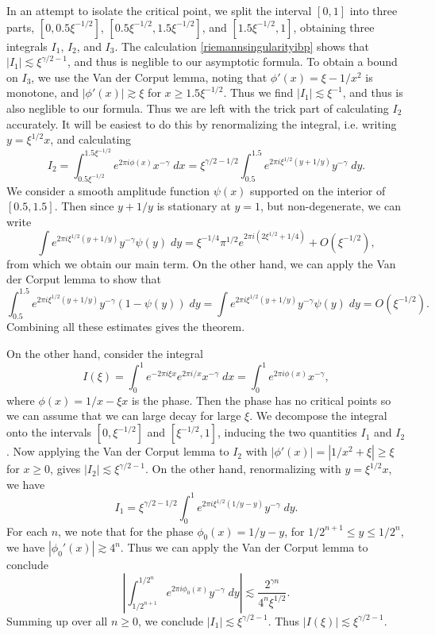 \begin{example}
  In an attempt to isolate the critical point, we split the interval $[0,1]$ into three parts, $[0,0.5 \xi^{-1/2}]$, $[0.5 \xi^{-1/2},1.5 \xi^{-1/2}]$, and $[1.5 \xi^{-1/2},1]$, obtaining three integrals $I_1$, $I_2$, and $I_3$. The calculation \eqref{riemannsingularityibp} shows that $|I_1| \lesssim \xi^{\gamma/2 - 1}$, and thus is neglible to our asymptotic formula. To obtain a bound on $I_3$, we use the Van der Corput lemma, noting that $\phi'(x) = \xi - 1/x^2$ is monotone, and $|\phi'(x)| \gtrsim \xi$ for $x \geq 1.5 \xi^{-1/2}$. Thus we find $|I_1| \lesssim \xi^{-1}$, and thus is also neglible to our formula. Thus we are left with the trick part of calculating $I_2$ accurately. It will be easiest to do this by renormalizing the integral, i.e. writing $y = \xi^{1/2} x$, and calculating
  \[ I_2 = \int_{0.5 \xi^{-1/2}}^{1.5 \xi^{-1/2}} e^{2 \pi i \phi(x)} x^{-\gamma}\; dx = \xi^{\gamma/2 - 1/2} \int_{0.5}^{1.5} e^{2 \pi i \xi^{1/2}(y + 1/y)} y^{-\gamma}\; dy. \]
  We consider a smooth amplitude function $\psi(x)$ supported on the interior of $[0.5,1.5]$. Then since $y + 1/y$ is stationary at $y = 1$, but non-degenerate, we can write
  \[ \int e^{2 \pi i \xi^{1/2}(y + 1/y)} y^{-\gamma} \psi(y)\; dy = \xi^{-1/4} \pi^{1/2} e^{2 \pi i(2\xi^{1/2} + 1/4)} + O(\xi^{-1/2}), \]
  from which we obtain our main term. On the other hand, we can apply the Van der Corput lemma to show that
  \[ \int_{0.5}^{1.5} e^{2 \pi i \xi^{1/2}(y + 1/y)} y^{-\gamma} (1 - \psi(y))\; dy = \int e^{2 \pi i \xi^{1/2}(y + 1/y)} y^{-\gamma} \psi(y)\; dy = O(\xi^{-1/2}). \]
  Combining all these estimates gives the theorem.

  On the other hand, consider the integral
  \[ I(\xi) = \int_0^1 e^{-2 \pi i \xi x} e^{2 \pi i/x} x^{-\gamma}\; dx = \int_0^1 e^{2 \pi i \phi(x)} x^{-\gamma}, \]
  where $\phi(x) = 1/x - \xi x$ is the phase. Then the phase has no critical points so we can assume that we can large decay for large $\xi$. We decompose the integral onto the intervals $[0,\xi^{-1/2}]$ and $[\xi^{-1/2},1]$, inducing the two quantities $I_1$ and $I_2$. Now applying the Van der Corput lemma to $I_2$ with $|\phi'(x)| = |1/x^2 + \xi| \geq \xi$ for $x \geq 0$, gives $|I_2| \lesssim \xi^{\gamma/2 - 1}$. On the other hand, renormalizing with $y = \xi^{1/2} x$, we have
  \[ I_1 = \xi^{\gamma/2 - 1/2} \int_0^1 e^{2 \pi i \xi^{1/2} (1/y - y)} y^{-\gamma}\; dy. \]
  For each $n$, we note that for the phase $\phi_0(x) = 1/y - y$, for $1/2^{n+1} \leq y \leq 1/2^n$, we have $|\phi_0'(x)| \gtrsim 4^n$. Thus we can apply the Van der Corput lemma to conclude
  \[ \left| \int_{1/2^{n+1}}^{1/2^n} e^{2 \pi i \phi_0(x)} y^{-\gamma}\; dy \right| \lesssim \frac{2^{\gamma n}}{4^n \xi^{1/2}}. \]
  Summing up over all $n \geq 0$, we conclude $|I_1| \lesssim \xi^{\gamma/2 - 1}$. Thus $|I(\xi)| \lesssim \xi^{\gamma/2 - 1}$.


\end{example}
